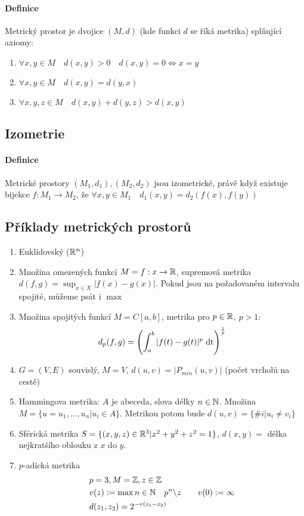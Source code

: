 \documentclass[a4paper,10pt]{article}
\begin{document}
\paragraph{Definice}
Metrický prostor je dvojice $(M, d)$ (kde funkci $d$ se říká metrika) splňující axiomy:
\begin{enumerate}
	\item $\forall x,y \in M \quad d(x,y)\gt 0 \quad d(x,y) = 0 \Leftrightarrow x = y$
	\item $\forall x,y \in M \quad d(x,y)=d(y,x)$
	\item $\forall x,y,z \in M \quad d(x,y)+d(y,z)\gt d(x,y)$
\end{enumerate}

\subsection{Izometrie}
\setcounter{equation}{0}
\paragraph{Definice}
Metrické prostory $(M_1, d_1), (M_2, d_2)$ jsou izometrické, právě když existuje
bijekce $f:M_1 \to M_2$, že $\forall x,y \in M_1 \quad d_1(x,y)=d_2(f(x),f(y))$

\subsection{Příklady metrických prostorů}
\setcounter{equation}{0}
\begin{enumerate}
	\item Euklidovský ($\mathbb{R}^n$)
	\item Množina omezených funkcí $M = f:x\to\mathbb{R}$, supremová metrika $d(f,g) =
	\sup_{x\in X} |f(x)-g(x)|$.
	Pokud jsou na požadovaném intervalu spojité, můžeme psát i $\max$
	\item Množina spojitých funkcí $M = C[a,b]$, metrika pro $p \in \mathbb{R}$, $p \gt
	1$:
	\begin{align*}
		d_p(f,g) = \left( \int_a^b|f(t)-g(t)|^p \operatorname*{\,dt} \right)^{\frac{1}{p}}
	\end{align*}
	\item $G = (V,E)$ souvislý, $M = V$, $d(u,v) = |P_{min} (u,v)|$ (počet
	vrcholů na cestě)
	\item Hammingova metrika: $A$ je abeceda, slova délky $n \in \mathbb{N}$. Množina $M
	= \{u = u_1, ..., u_n | u_i \in A\}$. Metrikou potom bude $d(u,v) = \{\#i | u_i
	\neq v_i \}$
	\item Sférická metrika $S=\{(x,y,z)\in\mathbb{R}^3| x^2 + y^2 + z^2 = 1 \}$, $d(x,y)
	= $ délka nejkratšího oblouku z $x$ do $y$.
	\item $p$-adická metrika 
	\begin{align*}
		&p = 3, M = \mathbb{Z}, z \in \mathbb{Z} \\
		&v(z) := \max n \in \mathbb{N} \quad p^n \backslash z \qquad v(0) := \infty \\
		&d(z_1, z_2) = 2^{-v(z_1-z_2)}
	\end{align*}
\end{enumerate}
\end{document}
